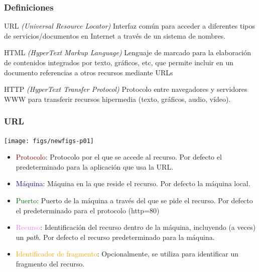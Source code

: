 \documentclass[hyperref={pdfpagelabels=true},ucs]{beamer}
\newcommand{\res}[1]{\textcolor{darkred}{#1}}
\begin{document}
\begin{frame}
\frametitle{Definiciones}

\begin{block}{URL \emph{(Universal Resource Locator)}}
Interfaz común para acceder a diferentes tipos de servicios/documentos
en Internet a través de un sistema de nombres.
\end{block}

\begin{block}{HTML \emph{(HyperText Markup Language)}}
Lenguaje de marcado para la elaboración de contenidos integrados por
texto, gráficos, etc, que permite incluir en un documento referencias
a otros recursos mediante URLs
\end{block}


\begin{block}{HTTP \emph{(HyperText Transfer Protocol)}}
Protocolo entre navegadores y servidores WWW para transferir
recursos hipermedia (texto, gráficos, audio, vídeo).
\end{block}

\end{frame}





\begin{frame}
\frametitle{URL}

\begin{center}
\texttt{[image: figs/newfigs-p01]}
\end{center}

\begin{itemize}
\item \res{Protocolo}: Protocolo por el que se accede al recurso. Por
  defecto el predeterminado para la aplicación que usa la URL.
\item \textcolor{darkblue}{Máquina}: Máquina en la que reside el recurso. Por defecto la
  máquina local.
\item \textcolor{darkgreen}{Puerto}: Puerto de la máquina a través del que se pide el
  recurso. Por defecto el predeterminado para el protocolo (http=80)
\item \textcolor{violet}{Recurso}: Identificación del recurso dentro de la máquina,
  incluyendo (a veces) un \emph{path}. Por defecto el recurso
  predeterminado para la máquina.
\item \textcolor{orange}{Identificador de fragmento}: Opcionalmente, se utiliza para
  identificar un fragmento del recurso.
\end{itemize}
\end{frame}
\end{document}
